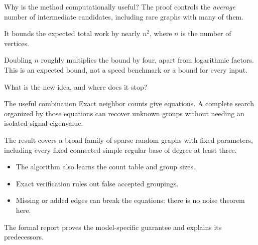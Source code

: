 \begin{frame}{Why is the method computationally useful?}
The proof controls the \emph{average} number of intermediate candidates,
including rare graphs with many of them.

It bounds the expected total work by nearly $n^2$, where $n$ is the number of vertices.
\begin{center}
\end{center}
Doubling $n$ roughly multiplies the bound by four, apart from logarithmic factors.
This is an expected bound, not a speed benchmark or a bound for every input.
\end{frame}

\begin{frame}{What is the new idea, and where does it stop?}
\begin{block}{The useful combination}
Exact neighbor counts give equations. A complete search organized by those
equations can recover unknown groups without needing an isolated signal eigenvalue.
\end{block}
The result covers a broad family of sparse random graphs with fixed parameters,
including every fixed connected simple regular base of degree at least three.
\begin{itemize}
\item The algorithm also learns the count table and group sizes.
\item Exact verification rules out false accepted groupings.
\item Missing or added edges can break the equations: there is no noise theorem here.
\end{itemize}
The formal report proves the model-specific guarantee and explains its predecessors.
\end{frame}
